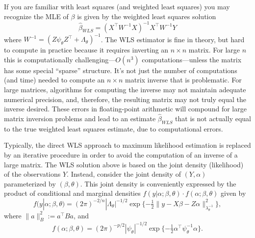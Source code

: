 \documentclass[
]{book}
\begin{document}
If you are familiar with least squares (and weighted least squares) you may recognize the MLE of \(\beta\) is given by the weighted least squares solution
\begin{equation}
\hat\beta_{WLS} = (X^\top W^{-1}X)^{-1}X^\top W^{-1}Y
\label{eq:WLS1}
\end{equation}
where \(W^{-1} = (Z \psi_\theta Z^\top + \Lambda_\theta)^{-1}\). The WLS estimator is fine in theory, but hard to compute in practice because it requires inverting an \(n\times n\) matrix. For large \(n\) this is computationally challenging---\(O(n^3)\) computations---unless the matrix has some special ``sparse'' structure. It's not just the number of computations (and time) needed to compute an \(n\times n\) matrix inverse that is problematic. For large matrices, algorithms for computing the inverse may not maintain adequate numerical precision, and, therefore, the resulting matrix may not truly equal the inverse desired. These errors in floating-point arithmetic will compound for large matrix inversion problems and lead to an estimate \(\hat\beta_{WLS}\) that is not actually equal to the true weighted least squares estimate, due to computational errors.

Typically, the direct WLS approach to maximum likelihood estimation is replaced by an iterative procedure in order to avoid the computation of an inverse of a large matrix. The WLS solution above is based on the joint density (likelihood) of the observations \(Y\). Instead, consider the joint density of \((Y,\alpha)\) parameterized by \((\beta, \theta)\). This joint density is conveniently expressed by the product of conditional and marginal densities \(f(y|\alpha;\beta,\theta)\cdot f(\alpha;\beta,\theta)\) given by
\[f(y|\alpha;\beta,\theta) = (2\pi)^{-2/n}|\Lambda_\theta|^{-1/2}\exp\{-\tfrac12\|y - X\beta - Z\alpha\|^2_{\lambda_\theta^{-1}}\},\]
where \(\|a\|_B^2 := a^\top Ba\), and
\[f(\alpha;\beta,\theta) = (2\pi)^{-p/2}|\psi_\theta|^{-1/2}\exp\{-\tfrac12\alpha^\top \psi_\theta^{-1}\alpha\}.\]
\end{document}

